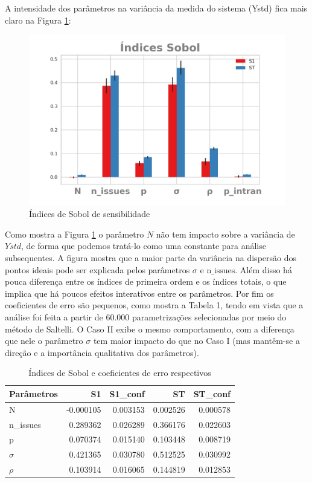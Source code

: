 A intensidade dos parâmetros na variância da medida do sistema (Ystd) fica mais
claro na Figura \ref{fig:sobol1}:

\begin{figure}[H]
  \centering
  \includegraphics{ims/barplotmuto5k.png}
  \caption{Índices de Sobol de sensibilidade}
  \label{fig:sobol1}
\end{figure}

Como mostra a Figura \ref{fig:sobol1} o parâmetro \(N\) não tem impacto sobre a
variância de \(Ystd\), de forma que podemos tratá-lo como uma constante para
análise subsequentes. A figura mostra que a maior parte da variância na
dispersão dos pontos ideais pode ser explicada pelos parâmetros \(\sigma\) e
\(\text{n\_issues}\). Além disso há pouca diferença entre os índices de primeira
ordem e os índices totais, o que implica que há poucos efeitos interativos entre
os parâmetros. Por fim os coeficientes de erro são pequenos, como mostra a
Tabela 1, tendo em vista que a análise foi feita a partir de 60.000
parametrizações selecionadas por meio do método de Saltelli. O Caso II exibe o
mesmo comportamento, com a diferença que nele o parâmetro \(\sigma\) tem maior
impacto do que no Caso I (mas mantêm-se a direção e a importância qualitativa dos
parâmetros).


\begin{table}[H]
\centering
\caption{Índices de Sobol e coeficientes de erro respectivos}
\label{my-label}
\begin{tabular}{|l|r|r|r|r|}
\hline
\rowcolor[HTML]{C0C0C0} 
Parâmetros & S1        & S1\_conf & ST       & ST\_conf \\ \hline
N          & -0.000105 & 0.003153 & 0.002526 & 0.000578 \\ \hline
n\_issues  & 0.289362  & 0.026289 & 0.366176 & 0.022603 \\ \hline
p          & 0.070374  & 0.015140 & 0.103448 & 0.008719 \\ \hline
\(\sigma\) & 0.421365  & 0.030780 & 0.512525 & 0.030992 \\ \hline
\(\rho\)   & 0.103914  & 0.016065 & 0.144819 & 0.012853 \\ \hline
\end{tabular}
\end{table}


